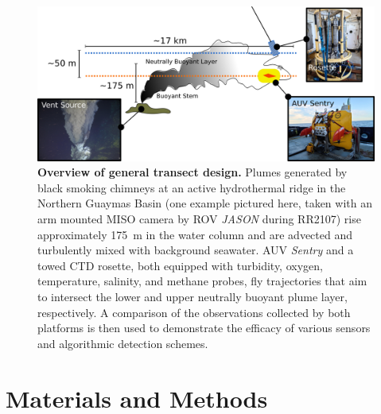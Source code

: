 \begin{figure}[h!]
    \centering
    \includegraphics[width=\columnwidth]{figures/chap3_schematic.jpg}
    \caption[Overview of transect design for hydrothermal discovery]{\textbf{Overview of general transect design.} Plumes generated by black smoking chimneys at an active hydrothermal ridge in the Northern Guaymas Basin (one example pictured here, taken with an arm mounted MISO camera by ROV \emph{JASON} during RR2107) rise approximately \SI{175}{\meter} in the water column and are advected and turbulently mixed with background seawater. AUV \emph{Sentry} and a towed CTD rosette, both equipped with turbidity, oxygen, temperature, salinity, and methane probes, fly trajectories that aim to intersect the lower and upper neutrally buoyant plume layer, respectively. A comparison of the observations collected by both platforms is then used to demonstrate the efficacy of various sensors and algorithmic detection schemes.}
    \label{fig:schematic}
\end{figure}

\section{Materials and Methods}


